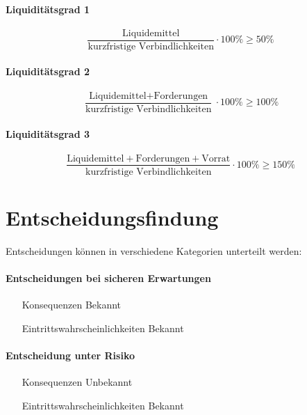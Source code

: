\documentclass[../main.tex]{subfiles}
\begin{document}
            \paragraph{Liquiditätsgrad 1}
                \begin{equation}
                    \frac{\text{Liquidemittel}}{\text{kurzfristige Verbindlichkeiten}} \cdot 100\% \geq 50\%
                \end{equation}
                
            \paragraph{Liquiditätsgrad 2}
                \begin{equation}
                    \frac{\text{Liquidemittel} + \text{Forderungen}}{\text{kurzfristige Verbindlichkeiten}} \cdot 100\% \geq 100\%
                \end{equation}
                
            \paragraph{Liquiditätsgrad 3}
                \begin{equation}
                    \frac{\text{Liquidemittel} + \text{Forderungen} + \text{Vorrat}}{\text{kurzfristige Verbindlichkeiten}} \cdot 100\% \geq 150\%
                \end{equation}        
    
    \section{Entscheidungsfindung}
        Entscheidungen können in verschiedene Kategorien unterteilt werden:
        
        \paragraph{Entscheidungen bei sicheren Erwartungen}
            \begin{itemize}
                \item[Konsequenzen] Bekannt
                \item[Eintrittswahrscheinlichkeiten] Bekannt
            \end{itemize}
        
        \paragraph{Entscheidung unter Risiko}
            \begin{itemize}
                \item[Konsequenzen] Unbekannt
                \item[Eintrittswahrscheinlichkeiten] Bekannt
            \end{itemize}
        
\end{document}
